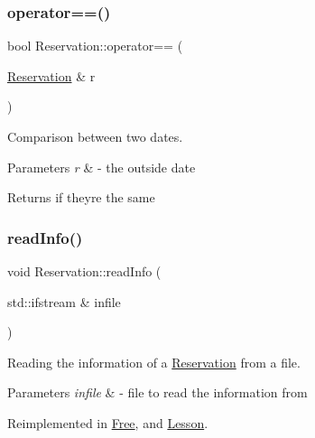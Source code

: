 \subsubsection{\texorpdfstring{operator==()}{operator==()}\hspace{0.1cm}{\footnotesize\ttfamily [2/2]}}
{\footnotesize\ttfamily bool Reservation\+::operator== (\begin{DoxyParamCaption}\item[{\mbox{\hyperlink{class_reservation}{Reservation}} \&}]{r }\end{DoxyParamCaption})}



Comparison between two dates. 


\begin{DoxyParams}{Parameters}
{\em r} & -\/ the outside date \\
\hline
\end{DoxyParams}
\begin{DoxyReturn}{Returns}
if they\textquotesingle{}re the same 
\end{DoxyReturn}
\mbox{\label{class_reservation_acff32024a350c2156af9f74522c59b7b}} 
\subsubsection{\texorpdfstring{read\+Info()}{readInfo()}}
{\footnotesize\ttfamily void Reservation\+::read\+Info (\begin{DoxyParamCaption}\item[{std\+::ifstream \&}]{infile }\end{DoxyParamCaption})\hspace{0.3cm}{\ttfamily [virtual]}}



Reading the information of a \mbox{\hyperlink{class_reservation}{Reservation}} from a file. 


\begin{DoxyParams}{Parameters}
{\em infile} & -\/ file to read the information from \\
\hline
\end{DoxyParams}


Reimplemented in \mbox{\hyperlink{class_free_ad1023c825c9790edf0797e2e69dd2fcf}{Free}}, and \mbox{\hyperlink{class_lesson_a3ac64e2f79bc9e381634d5d30499e8f1}{Lesson}}.


